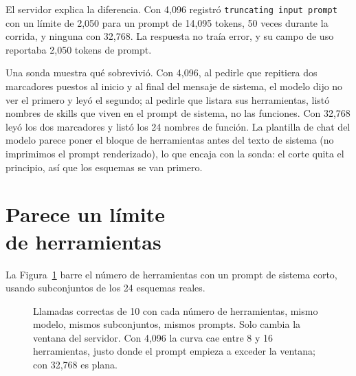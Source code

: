 \documentclass[10pt]{article}
\begin{document}
El servidor explica la diferencia. Con 4,096 registró \texttt{truncating input prompt} con un límite de 2,050 para un prompt de 14,095 tokens, 50 veces durante la corrida, y ninguna con 32,768. La respuesta no traía error, y su campo de uso reportaba 2,050 tokens de prompt.

Una sonda muestra qué sobrevivió. Con 4,096, al pedirle que repitiera dos marcadores puestos al inicio y al final del mensaje de sistema, el modelo dijo no ver el primero y leyó el segundo; al pedirle que listara sus herramientas, listó nombres de skills que viven en el prompt de sistema, no las funciones. Con 32,768 leyó los dos marcadores y listó los 24 nombres de función. La plantilla de chat del modelo parece poner el bloque de herramientas antes del texto de sistema (no imprimimos el prompt renderizado), lo que encaja con la sonda: el corte quita el principio, así que los esquemas se van primero.

\section{Parece un límite\\de herramientas}

La Figura~\ref{fig:sweep} barre el número de herramientas con un prompt de sistema corto, usando subconjuntos de los 24 esquemas reales.

\begin{figure}[H]
\centering
{}
\caption{Llamadas correctas de 10 con cada número de herramientas, mismo modelo, mismos subconjuntos, mismos prompts. Solo cambia la ventana del servidor. Con 4,096 la curva cae entre 8 y 16 herramientas, justo donde el prompt empieza a exceder la ventana; con 32,768 es plana.}
\label{fig:sweep}
\end{figure}
\end{document}
